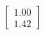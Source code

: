 \documentclass[preview]{standalone}
\begin{document}
\begin{align*}
\begin{bmatrix} 1.00 \\ 1.42 \end{bmatrix}
\end{align*}
\end{document}
